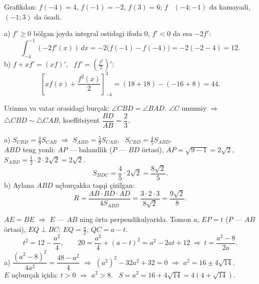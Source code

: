 \newpage
{}
Grafikdan: $f(-4)=4$, $f(-1)=-2$, $f(3)=6$; $f$ \ $(-4;-1)$ da kamayadi, $(-1;3)$ da ösadi.

a) $f'\ge0$ bölgan joyda integral ostidagi ifoda $0$, $f'<0$ da esa $-2f'$:
\[\int_{-4}^{-1}(-2f'(x))\,dx=-2\bigl(f(-1)-f(-4)\bigr)=-2(-2-4)=12.\]
b) $f+xf'=(xf)'$, \ $ff'=\left(\frac{f^2}2\right)'$:
\[\left[xf(x)+\frac{f^2(x)}2\right]_{-4}^{3}=\left(18+18\right)-\left(-16+8\right)=44.\]

\newpage
{}
Urinma va vatar orasidagi burçak: $\angle CBD=\angle BAD$. $\angle C$ umumiy $\Rightarrow$ $\triangle CBD\sim\triangle CAB$, koeffitsiyent $\dfrac{BD}{AB}=\dfrac23$.

a) $S_{CBD}=\frac49S_{CAB}$ $\Rightarrow$ $S_{ABD}=\frac59S_{CAB}$, \ $S_{CBD}=\frac45S_{ABD}$.\\
$ABD$ teng yonli: $AP$ — balandlik ($P$ — $BD$ örtasi), $AP=\sqrt{9-1}=2\sqrt2$, \ $S_{ABD}=\frac12\cdot2\cdot2\sqrt2=2\sqrt2$.
\[S_{BDC}=\frac45\cdot2\sqrt2=\frac{8\sqrt2}5.\]
b) Aylana $ABD$ uçburçakka taşqi çizilgan:
\[R=\frac{AB\cdot BD\cdot AD}{4S_{ABD}}=\frac{3\cdot2\cdot3}{8\sqrt2}=\frac{9\sqrt2}8.\]

\newpage
{}
$AE=BE$ $\Rightarrow$ $E$ — $AB$ ning örta perpendikulyarida. Tomon $a$, $EP=t$ ($P$ — $AB$ örtasi), $EQ\perp BC$: $EQ=\frac a2$, $QC=a-t$.
\[t^2=12-\frac{a^2}4,\qquad 20=\frac{a^2}4+(a-t)^2=a^2-2at+12\ \Rightarrow\ t=\frac{a^2-8}{2a}.\]
a) $\dfrac{\left(a^2-8\right)^2}{4a^2}=\dfrac{48-a^2}4$ $\Rightarrow$ $\left(a^2\right)^2-32a^2+32=0$ $\Rightarrow$ $a^2=16\pm4\sqrt{14}$.\\
$E$ uçburçak içida: $t>0$ $\Rightarrow$ $a^2>8$. \ $S=a^2=16+4\sqrt{14}=4\left(4+\sqrt{14}\right)$.

